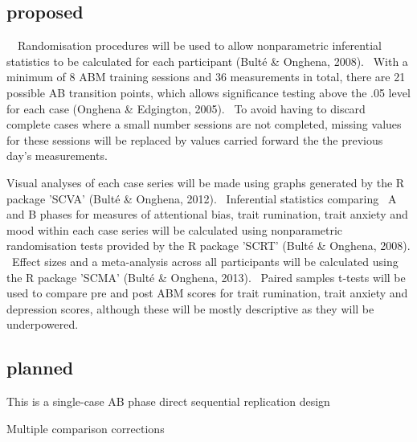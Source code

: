 \documentclass[man,a4paper,biblatex]{apa6}
\begin{document}
\subsection{proposed}

\ \ Randomisation procedures will be used to allow nonparametric inferential statistics to be calculated for each participant (Bult\'e \& Onghena, 2008). \ With a minimum of 8 ABM training sessions and 36 measurements in total, there are 21 possible AB transition points, which allows significance testing above the .05 level for each case (Onghena \& Edgington, 2005). \ To avoid having to discard complete cases where a small number sessions are not completed, missing values for these sessions will be replaced by values carried forward the the previous day's measurements.

Visual analyses of each case series will be made using graphs generated by the R package 'SCVA' (Bult\'e \& Onghena, 2012). \ Inferential statistics comparing \ A and B phases for measures of attentional bias, trait rumination, trait anxiety and mood within each case series will be calculated using nonparametric randomisation tests provided by the R package 'SCRT' (Bult\'e \& Onghena, 2008). \ Effect sizes and a meta-analysis across all participants will be calculated using the R package 'SCMA' (Bult\'e \& Onghena, 2013). \ Paired samples t-tests will be used to compare pre and post ABM scores for trait rumination, trait anxiety and depression scores, although these will be mostly descriptive as they will be underpowered.

\subsection{planned}
This is a single-case AB phase direct sequential replication design \parencite{bulte_when_2012} \parencite{onghena_customization_2005}

\begin{APAenumerate}
     \item Multiple comparison corrections
\end{APAenumerate}
\end{document}
